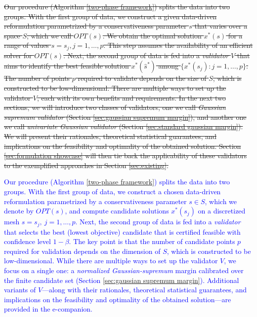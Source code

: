 \documentclass[mnsc,blindrev]{informs4} %
\newcommand{\dl}[1]{\textcolor{blue}{#1}}
\begin{document}
\sout{Our procedure (Algorithm \ref{two-phase framework}) splits the data into two groups. With the first group of data, we construct a given data-driven reformulation parametrized by a conservativeness parameter $s$ that varies over a space $S$, which we call $OPT(s)$. We obtain the optimal solution $x^*(s)$ for a range of values $s=s_j,j=1,\ldots,p$. This step assumes the availability of an efficient solver for $OPT(s)$. Next, the second group of data is fed into a \emph{validator} $V$ that aims to identify the best feasible solution $x^*(\hat s^*)$ among $\{x^*(s_j):j=1,\ldots,p\}$. The number of points $p$ required to validate depends on the size of $S$, which is constructed to be low-dimensional. There are multiple ways to set up the validator $V$, each with its own benefits and requirements. In the next two sections, we will introduce two classes of validators, one we call \emph{Gaussian supremum validator} (Section \ref{sec:gaussian supremum margin}), and another one we call \emph{univariate Gaussian validator} (Section \ref{sec:standard gaussian margin}). We will present their rationales, theoretical statistical guarantees, and implications on the feasibility and optimality of the obtained solution. Section \ref{sec:formulation showcase} will then tie back the applicability of these validators to the exemplified approaches in Section \ref{sec:existing}.}

\dl{Our procedure (Algorithm \ref{two-phase framework}) splits the data into two groups. With the first group of data, we construct a chosen data-driven reformulation parametrized by a conservativeness parameter $s\in S$, which we denote by $OPT(s)$, and compute candidate solutions $x^*(s_j)$ on a discretized mesh $s=s_j,\ j=1,\ldots,p$. Next, the second group of data is fed into a \emph{validator} that selects the best (lowest objective) candidate that is certified feasible with confidence level $1-\beta$. The key point is that the number of candidate points $p$ required for validation depends on the dimension of $S$, which is constructed to be low-dimensional. While there are multiple ways to set up the validator $V$, we focus on a single one: a \emph{normalized Gaussian-supremum} margin calibrated over the finite candidate set (Section \ref{sec:gaussian supremum margin}). Additional variants of $V$—along with their rationales, theoretical statistical guarantees, and implications on the feasibility and optimality of the obtained solution—are provided in the e-companion.}

\end{document}
